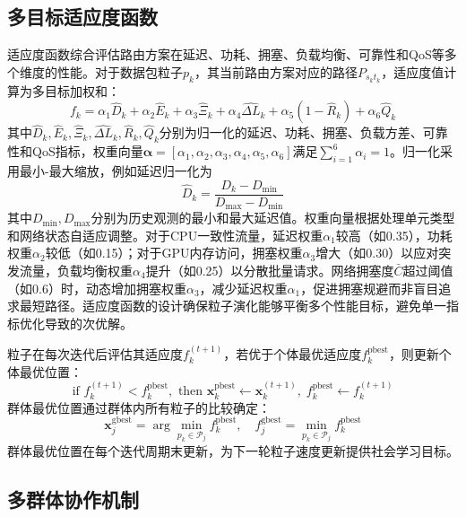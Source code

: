 \documentclass[11pt,a4paper]{article}
\begin{document}
\subsection{多目标适应度函数}

适应度函数综合评估路由方案在延迟、功耗、拥塞、负载均衡、可靠性和QoS等多个维度的性能。对于数据包粒子$p_k$，其当前路由方案对应的路径$P_{s_k t_k}$，适应度值计算为多目标加权和：
\begin{equation}
f_k = \alpha_1 \hat{D}_k + \alpha_2 \hat{E}_k + \alpha_3 \hat{\Xi}_k + \alpha_4 \hat{\Delta L}_k + \alpha_5 (1 - \hat{R}_k) + \alpha_6 \hat{Q}_k
\end{equation}
其中$\hat{D}_k, \hat{E}_k, \hat{\Xi}_k, \hat{\Delta L}_k, \hat{R}_k, \hat{Q}_k$分别为归一化的延迟、功耗、拥塞、负载方差、可靠性和QoS指标，权重向量$\boldsymbol{\alpha} = [\alpha_1, \alpha_2, \alpha_3, \alpha_4, \alpha_5, \alpha_6]$满足$\sum_{i=1}^6 \alpha_i = 1$。归一化采用最小-最大缩放，例如延迟归一化为
\begin{equation}
\hat{D}_k = \frac{D_k - D_{\min}}{D_{\max} - D_{\min}}
\end{equation}
其中$D_{\min}, D_{\max}$分别为历史观测的最小和最大延迟值。权重向量根据处理单元类型和网络状态自适应调整。对于CPU一致性流量，延迟权重$\alpha_1$较高（如0.35），功耗权重$\alpha_2$较低（如0.15）；对于GPU内存访问，拥塞权重$\alpha_3$增大（如0.30）以应对突发流量，负载均衡权重$\alpha_4$提升（如0.25）以分散批量请求。网络拥塞度$\bar{C}$超过阈值（如0.6）时，动态增加拥塞权重$\alpha_3$，减少延迟权重$\alpha_1$，促进拥塞规避而非盲目追求最短路径。适应度函数的设计确保粒子演化能够平衡多个性能目标，避免单一指标优化导致的次优解。

粒子在每次迭代后评估其适应度$f_k^{(t+1)}$，若优于个体最优适应度$f_k^{\text{pbest}}$，则更新个体最优位置：
\begin{equation}
\text{if } f_k^{(t+1)} < f_k^{\text{pbest}}, \text{ then } \mathbf{x}_k^{\text{pbest}} \leftarrow \mathbf{x}_k^{(t+1)}, \; f_k^{\text{pbest}} \leftarrow f_k^{(t+1)}
\end{equation}
群体最优位置通过群体内所有粒子的比较确定：
\begin{equation}
\mathbf{x}_j^{\text{gbest}} = \arg\min_{p_k \in \mathcal{P}_j} f_k^{\text{pbest}}, \quad f_j^{\text{gbest}} = \min_{p_k \in \mathcal{P}_j} f_k^{\text{pbest}}
\end{equation}
群体最优位置在每个迭代周期末更新，为下一轮粒子速度更新提供社会学习目标。

\subsection{多群体协作机制}
\end{document}
